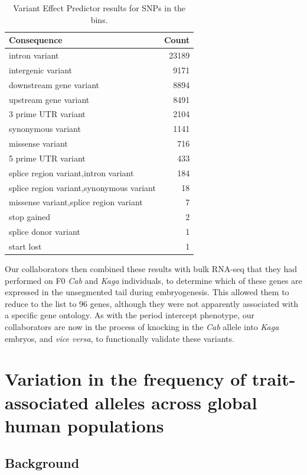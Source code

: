 \documentclass[
]{book}
\begin{document}
\begin{table}

\caption{\label{tab:psm-consequence-tbl}Variant Effect Predictor results for SNPs in the bins.}
\centering
\begin{tabular}[t]{l|r}
\hline
Consequence & Count\\
\hline
intron variant & 23189\\
\hline
intergenic variant & 9171\\
\hline
downstream gene variant & 8894\\
\hline
upstream gene variant & 8491\\
\hline
3 prime UTR variant & 2104\\
\hline
synonymous variant & 1141\\
\hline
missense variant & 716\\
\hline
5 prime UTR variant & 433\\
\hline
splice region variant,intron variant & 184\\
\hline
splice region variant,synonymous variant & 18\\
\hline
missense variant,splice region variant & 7\\
\hline
stop gained & 2\\
\hline
splice donor variant & 1\\
\hline
start lost & 1\\
\hline
\end{tabular}
\end{table}

Our collaborators then combined these results with bulk RNA-seq that they had performed on F0 \emph{Cab} and \emph{Kaga} individuals, to determine which of these genes are expressed in the unsegmented tail during embryogenesis. This allowed them to reduce to the list to 96 genes, although they were not apparently associated with a specific gene ontology. As with the period intercept phenotype, our collaborators are now in the process of knocking in the \emph{Cab} allele into \emph{Kaga} embryos, and \emph{vice versa}, to functionally validate these variants.

\hypertarget{Fst-chap}{%
\chapter{Variation in the frequency of trait-associated alleles across global human populations}\label{Fst-chap}}

\hypertarget{Fst-background}{%
\section{Background}\label{Fst-background}}
\end{document}
